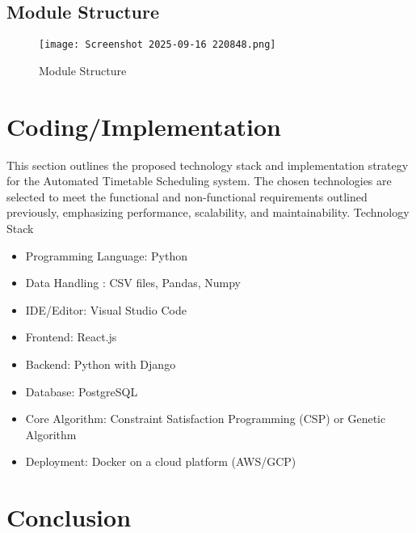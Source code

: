 \documentclass[a4paper,12pt]{article}
\begin{document}
\newpage
\subsection{Module Structure}
\begin{figure}[H]
    \centering
    \texttt{[image: Screenshot 2025-09-16 220848.png]}
    \caption{Module Structure}
    \label{fig:placeholder}
\end{figure}
\newpage



\section{Coding/Implementation}
This section outlines the proposed technology stack and implementation strategy for the Automated Timetable Scheduling system. The chosen technologies are selected to meet the functional and non-functional requirements outlined previously, emphasizing performance, scalability, and maintainability.
\newline
\newline
Technology Stack
\begin{itemize}
\item Programming Language: Python
\item Data Handling : CSV files, Pandas, Numpy
\item IDE/Editor: Visual Studio Code
\item Frontend: React.js

\item Backend: Python with Django

\item Database: PostgreSQL

\item Core Algorithm: Constraint Satisfaction Programming (CSP) or Genetic Algorithm

\item Deployment: Docker on a cloud platform (AWS/GCP)
\end{itemize}
\newpage
\section{Conclusion}
\end{document}

